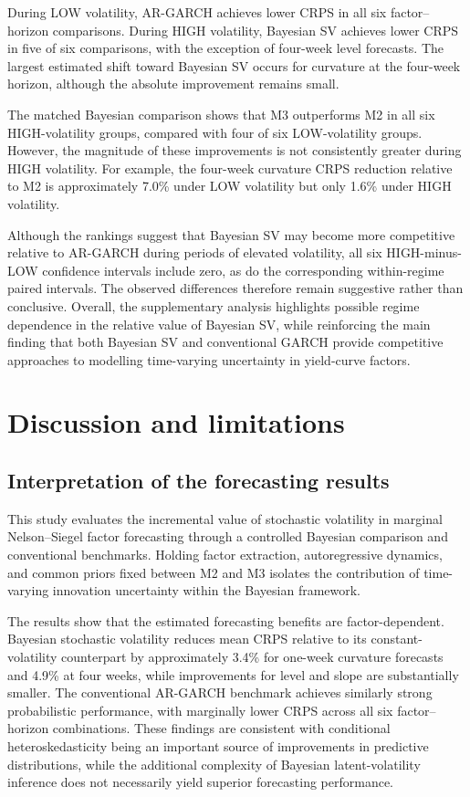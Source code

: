 \documentclass[
  12pt,
  letterpaper,
  DIV=11,
  numbers=noendperiod]{scrreprt}
\begin{document}
During LOW volatility, AR-GARCH achieves lower CRPS in all six
factor--horizon comparisons. During HIGH volatility, Bayesian SV
achieves lower CRPS in five of six comparisons, with the exception of
four-week level forecasts. The largest estimated shift toward Bayesian
SV occurs for curvature at the four-week horizon, although the absolute
improvement remains small.

The matched Bayesian comparison shows that M3 outperforms M2 in all six
HIGH-volatility groups, compared with four of six LOW-volatility groups.
However, the magnitude of these improvements is not consistently greater
during HIGH volatility. For example, the four-week curvature CRPS
reduction relative to M2 is approximately 7.0\% under LOW volatility but
only 1.6\% under HIGH volatility.

Although the rankings suggest that Bayesian SV may become more
competitive relative to AR-GARCH during periods of elevated volatility,
all six HIGH-minus-LOW confidence intervals include zero, as do the
corresponding within-regime paired intervals. The observed differences
therefore remain suggestive rather than conclusive. Overall, the
supplementary analysis highlights possible regime dependence in the
relative value of Bayesian SV, while reinforcing the main finding that
both Bayesian SV and conventional GARCH provide competitive approaches
to modelling time-varying uncertainty in yield-curve factors.

\chapter{Discussion and limitations}\label{sec-discussion}

\section{Interpretation of the forecasting
results}\label{interpretation-of-the-forecasting-results}

This study evaluates the incremental value of stochastic volatility in
marginal Nelson--Siegel factor forecasting through a controlled Bayesian
comparison and conventional benchmarks. Holding factor extraction,
autoregressive dynamics, and common priors fixed between M2 and M3
isolates the contribution of time-varying innovation uncertainty within
the Bayesian framework.

The results show that the estimated forecasting benefits are
factor-dependent. Bayesian stochastic volatility reduces mean CRPS
relative to its constant-volatility counterpart by approximately 3.4\%
for one-week curvature forecasts and 4.9\% at four weeks, while
improvements for level and slope are substantially smaller. The
conventional AR-GARCH benchmark achieves similarly strong probabilistic
performance, with marginally lower CRPS across all six factor--horizon
combinations. These findings are consistent with conditional
heteroskedasticity being an important source of improvements in
predictive distributions, while the additional complexity of Bayesian
latent-volatility inference does not necessarily yield superior
forecasting performance.
\end{document}

